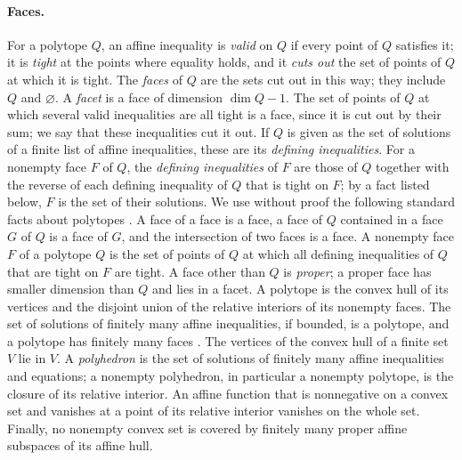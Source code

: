 \documentclass[11pt]{article}
\theoremstyle{definition}
\theoremstyle{remark}
\begin{document}
\paragraph{Faces.} For a polytope $Q$, an affine inequality is \emph{valid} on $Q$ if every
point of $Q$ satisfies it; it is \emph{tight} at the points where equality holds, and it \emph{cuts out} the set of points of $Q$ at which it is tight. The \emph{faces} of $Q$ are the sets cut out in
this way; they include $Q$ and $\varnothing$. A \emph{facet} is a face of dimension $\dim Q-1$. The set of
points of $Q$ at which several valid inequalities are all tight is a face, since it is cut out by their sum; we say that these inequalities cut it out. If $Q$ is given as the set of solutions of a finite list of affine inequalities,
these are its \emph{defining inequalities}. For a nonempty face $F$ of $Q$, the \emph{defining inequalities} of $F$ are those of $Q$ together with the reverse of each defining inequality of $Q$ that is tight on $F$; by a fact listed below, $F$ is the set of their solutions. We use without proof the following standard facts about polytopes \cite[Chapters~1--2]{Ziegler}. A face of a face is a face, a face of $Q$ contained in a face $G$ of $Q$ is a face of $G$, and the intersection of two faces is a face. A nonempty
face $F$ of a polytope $Q$ is the set of points of $Q$ at which all defining inequalities of $Q$ that are
tight on $F$ are tight. A face other than $Q$ is \emph{proper}; a proper face has smaller dimension than $Q$ and lies in a facet. A polytope is
the convex hull of its vertices and the disjoint union of the relative interiors of its nonempty faces. The set of solutions of finitely many affine inequalities, if bounded, is a polytope, and a polytope has finitely many faces \cite[Theorem~1.1]{Ziegler}.
The vertices of the convex hull of a finite set $V$ lie in $V$. A \emph{polyhedron} is the set of solutions of finitely many affine inequalities and equations; a nonempty polyhedron, in particular a nonempty polytope, is the closure of its relative interior. An affine function that is nonnegative on a convex set and vanishes at a point of its relative interior vanishes on the whole set. Finally, no nonempty convex set is covered by finitely
many proper affine subspaces of its affine hull.
\end{document}
